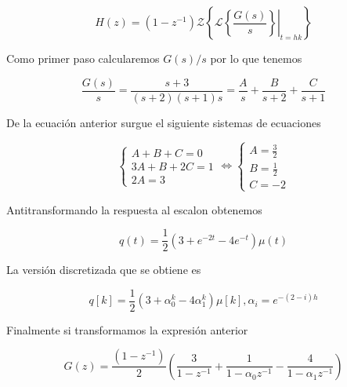 \documentclass{article}
\newcommand{\laplaceTransform}[1]{\mathcal{L}\left\{ #1 \right\}}
\newcommand{\syseq}[1]{ \left\{  
                            \begin{array}{c}
                                #1
                            \end{array}
                        \right. }
\begin{document}
        \begin{equation}
            H(z) = (1-z^{-1})\mathcal{Z}\left\{ \left. \laplaceTransform{ \frac{G(s)}{s} }\right|_{t=hk} \right\}
        \end{equation}

        Como primer paso calcularemos $G(s)/s$ por lo que tenemos 

        \begin{equation}
            \frac{G(s)}{s} = \frac{s+3}{( s+2 )(s+1)s} = \frac{A}{s} + \frac{B}{s+2} + \frac{C}{s+1}
        \end{equation}

        De la ecuación anterior surgue el siguiente sistemas de ecuaciones 

        \begin{equation}
            \left\{
                \begin{array}{c}
                    A+B+C = 0 \\
                    3A + B + 2C = 1 \\
                    2A = 3
                \end{array}    
            \right.
            \Leftrightarrow
            \syseq{
                A = \frac{3}{2} \\ 
                B = \frac{1}{2} \\
                C = -2
            }   
        \end{equation}

        Antitransformando la respuesta al escalon obtenemos 

        \begin{equation}
            q(t) = \frac{1}{2} \left( 3 + e^{-2t} - 4e^{-t} \right)\mu(t)
        \end{equation}

        La versión discretizada que se obtiene es 

        \begin{equation}
            q[k] = \frac{1}{2} \left( 3 + \alpha_0^k - 4 \alpha_1^k \right) \mu[k], \alpha_i = e^{-(2 - i)h}
        \end{equation}

        Finalmente si transformamos la expresión anterior 

        \begin{equation}
            G(z) = \frac{( 1 - z^{-1} )}{2} 
            \left( 
                \frac{3}{1 - z^{-1}} 
                + \frac{1}{1 - \alpha_0z^{-1}}
                - \frac{4}{1 - \alpha_1z^{-1}}
            \right)
        \end{equation}
\end{document}
